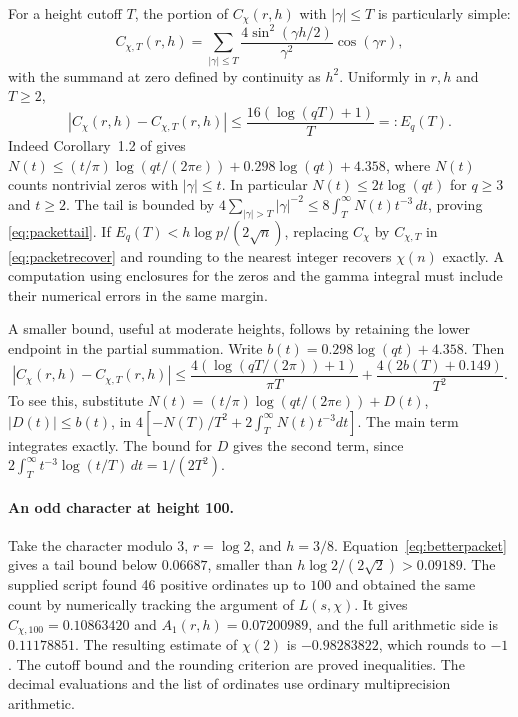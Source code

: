 \documentclass[11pt,letterpaper]{article}
\theoremstyle{remark}\newtheorem{remark}[theorem]{Remark}
\begin{document}
For a height cutoff $T$, the portion of $C_\chi(r,h)$ with $|\gamma|\le T$
is particularly simple:
\[
 C_{\chi,T}(r,h)=\sum_{|\gamma|\le T}
       \frac{4\sin^2(\gamma h/2)}{\gamma^2}\cos(\gamma r),
\]
with the summand at zero defined by continuity as $h^2$. Uniformly in $r,h$
and $T\ge2$,
\begin{equation}\label{eq:packettail}
   |C_\chi(r,h)-C_{\chi,T}(r,h)|
           \le \frac{16(\log(qT)+1)}{T}=:E_q(T).
\end{equation}
Indeed Corollary~1.2 of \cite{zeroct} gives
$N(t)\le(t/\pi)\log(qt/(2\pi e))+0.298\log(qt)+4.358$,
where $N(t)$ counts nontrivial zeros with $|\gamma|\le t$. In particular
$N(t)\le 2t\log(qt)$ for $q\ge3$ and $t\ge2$.
The tail is bounded by $4\sum_{|\gamma|>T}|\gamma|^{-2}
\le8\int_T^\infty N(t)t^{-3}\,dt$, proving \eqref{eq:packettail}.
If $E_q(T)<h\log p/(2\sqrt n)$, replacing $C_\chi$ by $C_{\chi,T}$
in \eqref{eq:packetrecover} and rounding to the nearest integer recovers
$\chi(n)$ exactly. A computation using enclosures for the zeros and the
gamma integral must include their numerical errors in the same margin.

A smaller bound, useful at moderate heights, follows by retaining the
lower endpoint in the partial summation. Write $b(t)=0.298\log(qt)+4.358$.
Then
\begin{equation}\label{eq:betterpacket}
 |C_\chi(r,h)-C_{\chi,T}(r,h)|\le
 \frac{4(\log(qT/(2\pi))+1)}{\pi T}
 +\frac{4(2b(T)+0.149)}{T^2}.
\end{equation}
To see this, substitute $N(t)=(t/\pi)\log(qt/(2\pi e))+D(t)$,
$|D(t)|\le b(t)$, in
$4[-N(T)/T^2+2\int_T^\infty N(t)t^{-3}dt]$.
The main term integrates exactly. The bound for $D$ gives the second term,
since $2\int_T^\infty t^{-3}\log(t/T)\,dt=1/(2T^2)$.

\paragraph{An odd character at height 100.}
Take the character modulo $3$, $r=\log 2$, and $h=3/8$.
Equation~\eqref{eq:betterpacket} gives a tail bound below $0.06687$,
smaller than $h\log 2/(2\sqrt2)>0.09189$. The supplied script found
46 positive ordinates up to $100$ and obtained the same count by
numerically tracking the argument of $L(s,\chi)$.
It gives $C_{\chi,100}=0.10863420$ and
$A_1(r,h)=0.07200989$, and the full arithmetic side is $0.11178851$.
The resulting estimate of $\chi(2)$ is $-0.98283822$, which rounds to
$-1$. The cutoff bound and the rounding criterion are proved inequalities.
The decimal evaluations and the list of ordinates use ordinary
multiprecision arithmetic.
\end{document}
